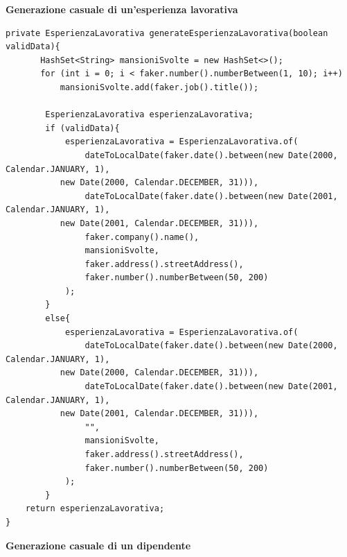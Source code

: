 \documentclass[ 4paper,11pt,openany]{book}
\begin{document}
\textbf{Generazione casuale di un'esperienza lavorativa}
\begin{lstlisting}[basicstyle=\small,xleftmargin=-0.5cm]
private EsperienzaLavorativa generateEsperienzaLavorativa(boolean validData){
       HashSet<String> mansioniSvolte = new HashSet<>();
       for (int i = 0; i < faker.number().numberBetween(1, 10); i++)
           mansioniSvolte.add(faker.job().title());

        EsperienzaLavorativa esperienzaLavorativa;
        if (validData){
            esperienzaLavorativa = EsperienzaLavorativa.of(
                dateToLocalDate(faker.date().between(new Date(2000, Calendar.JANUARY, 1),
		   new Date(2000, Calendar.DECEMBER, 31))),
                dateToLocalDate(faker.date().between(new Date(2001, Calendar.JANUARY, 1),
		   new Date(2001, Calendar.DECEMBER, 31))),
                faker.company().name(),
                mansioniSvolte,
                faker.address().streetAddress(),
                faker.number().numberBetween(50, 200)
            );
        }
        else{
            esperienzaLavorativa = EsperienzaLavorativa.of(
                dateToLocalDate(faker.date().between(new Date(2000, Calendar.JANUARY, 1),
		   new Date(2000, Calendar.DECEMBER, 31))),
                dateToLocalDate(faker.date().between(new Date(2001, Calendar.JANUARY, 1),
		   new Date(2001, Calendar.DECEMBER, 31))),
                "",
                mansioniSvolte,
                faker.address().streetAddress(),
                faker.number().numberBetween(50, 200)
            );
        }
	return esperienzaLavorativa;
}
\end{lstlisting}
\textbf{Generazione casuale di un dipendente}
\end{document}

